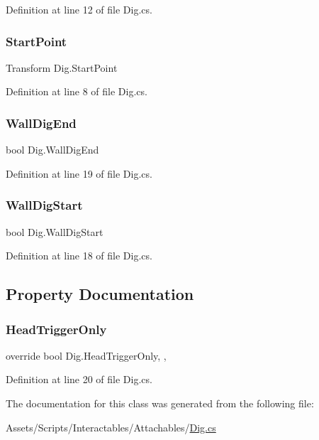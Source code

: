 Definition at line 12 of file Dig.\+cs.

\mbox{\label{class_dig_a03d78ff0b4137ed67c431c84f6cdc17e}} 
\subsubsection{\texorpdfstring{Start\+Point}{StartPoint}}
{\footnotesize\ttfamily Transform Dig.\+Start\+Point}



Definition at line 8 of file Dig.\+cs.

\mbox{\label{class_dig_a31ff02a0fcc0aa163ca780e5fa19b300}} 
\subsubsection{\texorpdfstring{Wall\+Dig\+End}{WallDigEnd}}
{\footnotesize\ttfamily bool Dig.\+Wall\+Dig\+End}



Definition at line 19 of file Dig.\+cs.

\mbox{\label{class_dig_a34e2de7c2acdaa8167f20609590d6b30}} 
\subsubsection{\texorpdfstring{Wall\+Dig\+Start}{WallDigStart}}
{\footnotesize\ttfamily bool Dig.\+Wall\+Dig\+Start}



Definition at line 18 of file Dig.\+cs.



\subsection{Property Documentation}
\mbox{\label{class_dig_a4bd8b131556afd7267d3da7de9dbe923}} 
\subsubsection{\texorpdfstring{Head\+Trigger\+Only}{HeadTriggerOnly}}
{\footnotesize\ttfamily override bool Dig.\+Head\+Trigger\+Only\hspace{0.3cm}{\ttfamily [get]}, {\ttfamily [set]}, {\ttfamily [protected]}}



Definition at line 20 of file Dig.\+cs.



The documentation for this class was generated from the following file\+:\begin{DoxyCompactItemize}
\item 
Assets/\+Scripts/\+Interactables/\+Attachables/\mbox{\hyperlink{_dig_8cs}{Dig.\+cs}}\end{DoxyCompactItemize}
